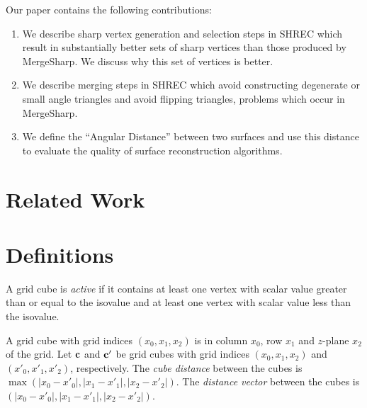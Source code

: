 

\maketitle

Our paper contains the following contributions:
\begin{enumerate}
\item We describe sharp vertex generation and selection steps
in SHREC which result in substantially better sets of sharp vertices
than those produced by MergeSharp.
We discuss why this set of vertices is better.
\item We describe merging steps in SHREC
which avoid constructing degenerate or small angle triangles and
avoid flipping triangles,
problems which occur in MergeSharp.
\item We define the ``Angular Distance'' between two surfaces
and use this distance to evaluate the quality 
of surface reconstruction algorithms.
\end{enumerate}

\section{Related Work}

\section{Definitions}

A grid cube is {\em active} if it contains at least one vertex with scalar value greater than or equal to the isovalue
and at least one vertex with scalar value less than the isovalue.

A grid cube with grid indices $(x_0,x_1,x_2)$ is in column $x_0$, row $x_1$
and $z$-plane $x_2$ of the grid.
Let $\mathbf{c}$ and $\mathbf{c}'$ be grid cubes with grid indices $(x_0,x_1,x_2)$
and $(x'_0,x'_1,x'_2)$, respectively.
The {\em cube distance} between the cubes 
is $\max(|x_0-x'_0|, |x_1-x'_1|, |x_2-x'_2|)$.
The {\em distance vector} between the cubes is
$(|x_0-x'_0|, |x_1-x'_1|, |x_2-x'_2|)$.

